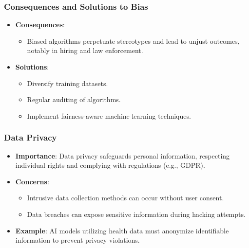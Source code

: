 \documentclass[aspectratio=169]{beamer}
\begin{document}
\begin{frame}[fragile]
    \frametitle{Consequences and Solutions to Bias}
    \begin{itemize}
        \item \textbf{Consequences}:
        \begin{itemize}
            \item Biased algorithms perpetuate stereotypes and lead to unjust outcomes, notably in hiring and law enforcement.
        \end{itemize}
        \item \textbf{Solutions}:
        \begin{itemize}
            \item Diversify training datasets.
            \item Regular auditing of algorithms.
            \item Implement fairness-aware machine learning techniques.
        \end{itemize}
    \end{itemize}
\end{frame}

\begin{frame}[fragile]
    \frametitle{Data Privacy}
    \begin{itemize}
        \item \textbf{Importance}: Data privacy safeguards personal information, respecting individual rights and complying with regulations (e.g., GDPR).
        \item \textbf{Concerns}:
        \begin{itemize}
            \item Intrusive data collection methods can occur without user consent.
            \item Data breaches can expose sensitive information during hacking attempts.
        \end{itemize}
        \item \textbf{Example}: AI models utilizing health data must anonymize identifiable information to prevent privacy violations.
    \end{itemize}
\end{frame}
\end{document}
